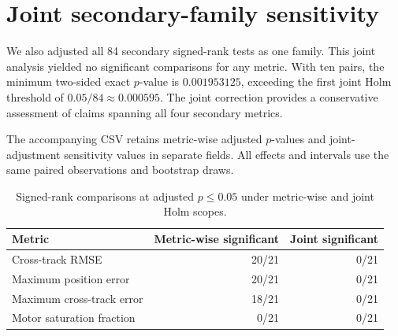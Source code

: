 \documentclass[11pt,a4paper]{article}
\begin{document}
\clearpage
\section{Joint secondary-family sensitivity}\label{app:joint}
We also adjusted all 84 secondary signed-rank tests as one family. This joint analysis yielded no significant comparisons for any metric. With ten pairs, the minimum two-sided exact $p$-value is $0.001953125$, exceeding the first joint Holm threshold of $0.05/84\approx0.000595$. The joint correction provides a conservative assessment of claims spanning all four secondary metrics.

The accompanying CSV retains metric-wise adjusted $p$-values and joint-adjustment sensitivity values in separate fields. All effects and intervals use the same paired observations and bootstrap draws.
\begin{table}[htbp]
\centering\small
\begin{tabular}{lrr}
\toprule
Metric & Metric-wise significant & Joint significant \\
\midrule
Cross-track RMSE & 20/21 & 0/21 \\
Maximum position error & 20/21 & 0/21 \\
Maximum cross-track error & 18/21 & 0/21 \\
Motor saturation fraction & 0/21 & 0/21 \\
\bottomrule
\end{tabular}
\caption{Signed-rank comparisons at adjusted $p\leq0.05$ under metric-wise and joint Holm scopes.}
\end{table}
\clearpage
\end{document}
